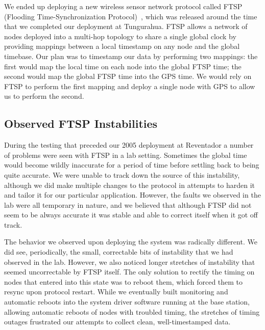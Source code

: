 We ended up deploying a new wireless sensor network protocol called FTSP
(Flooding Time-Synchronization Protocol)~\cite{ftsp}, which was released
around the time that we completed our deployment at Tungurahua.  FTSP allows
a network of nodes deployed into a multi-hop topology to share a single
global clock by providing mappings between a local timestamp on any node and
the global timebase. Our plan was to timestamp our data by performing two
mappings: the first would map the local time on each node into the global
FTSP time; the second would map the global FTSP time into the GPS time.  We
would rely on FTSP to perform the first mapping and deploy a single node with
GPS to allow us to perform the second.

\subsection{Observed FTSP Instabilities}

During the testing that preceded our 2005 deployment at Reventador a number
of problems were seen with FTSP in a lab setting. Sometimes the global time
would become wildly inaccurate for a period of time before settling back to
being quite accurate.  We were unable to track down the source of this
instability, although we did make multiple changes to the protocol in
attempts to harden it and tailor it for our particular application. However,
the faults we observed in the lab were all temporary in nature, and we
believed that although FTSP did not seem to be always accurate it was stable
and able to correct itself when it got off track.

The behavior we observed upon deploying the system was radically different.
We did see, periodically, the small, correctable bits of instability that we
had observed in the lab.  However, we also noticed longer stretches of
instability that seemed uncorrectable by FTSP itself.  The only solution to
rectify the timing on nodes that entered into this state was to reboot them,
which forced them to resync upon protocol restart.  While we eventually built
monitoring and automatic reboots into the system driver software running at
the base station, allowing automatic reboots of nodes with troubled timing,
the stretches of timing outages frustrated our attempts to collect clean,
well-timestamped data.

